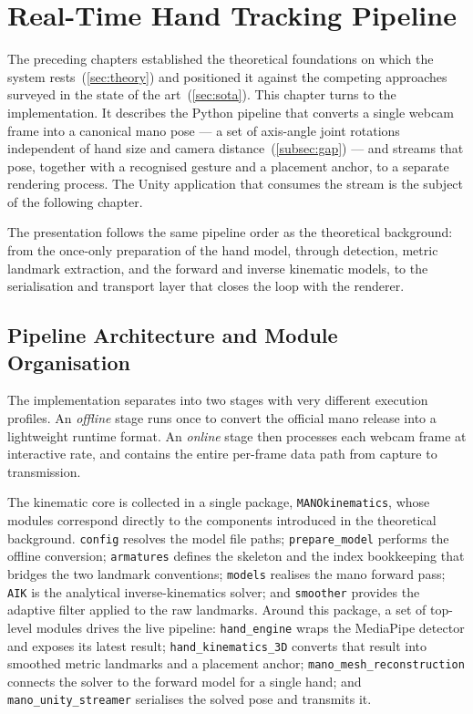 
\section{Real-Time Hand Tracking Pipeline}\label{sec:pipeline}

The preceding chapters established the theoretical foundations on which the
system rests~(\autoref{sec:theory}) and positioned it against the competing
approaches surveyed in the state of the art~(\autoref{sec:sota}). This chapter
turns to the implementation. It describes the Python pipeline that converts a
single webcam frame into a canonical \acrshort{mano} pose --- a set of axis-angle
joint rotations independent of hand size and camera distance~(\autoref{subsec:gap})
--- and streams that pose, together with a recognised gesture and a placement
anchor, to a separate rendering process. The Unity application that consumes the
stream is the subject of the following chapter.

The presentation follows the same pipeline order as the theoretical background:
from the once-only preparation of the hand model, through detection, metric
landmark extraction, and the forward and inverse kinematic models, to the
serialisation and transport layer that closes the loop with the renderer.

\subsection{Pipeline Architecture and Module Organisation}\label{subsec:pipeline_arch}

The implementation separates into two stages with very different execution
profiles. An \emph{offline} stage runs once to convert the official \acrshort{mano}
release into a lightweight runtime format. An \emph{online} stage then processes
each webcam frame at interactive rate, and contains the entire per-frame data
path from capture to transmission.

The kinematic core is collected in a single package, \texttt{MANOkinematics},
whose modules correspond directly to the components introduced in the
theoretical background. \texttt{config} resolves the model file paths;
\texttt{prepare\_model} performs the offline conversion; \texttt{armatures}
defines the skeleton and the index bookkeeping that bridges the two landmark
conventions; \texttt{models} realises the \acrshort{mano} forward pass;
\texttt{AIK} is the analytical inverse-kinematics solver; and \texttt{smoother}
provides the adaptive filter applied to the raw landmarks. Around this package, a
set of top-level modules drives the live pipeline: \texttt{hand\_engine} wraps the
MediaPipe detector and exposes its latest result; \texttt{hand\_kinematics\_3D}
converts that result into smoothed metric landmarks and a placement anchor;
\texttt{mano\_mesh\_reconstruction} connects the solver to the forward model for a
single hand; and \texttt{mano\_unity\_streamer} serialises the solved pose and
transmits it.

